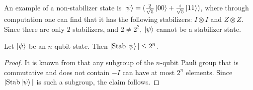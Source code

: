 \documentclass[12pt]{dalthesis}
\begin{document}
An example of a non-stabilizer state is $\ket{\psi} = (\frac{2}{\sqrt{5}}\ket{00} + \frac{i}{\sqrt{5}} \ket{11})$, where through computation one can find that it has the following stabilizers: $I \otimes I$ and $Z \otimes Z$. Since there are only $2$ stabilizers, and $2 \neq 2^2$, $\ket{\psi}$ cannot be a stabilizer state.

\begin{lemma}
\label{StabSize}
Let $\ket{\psi}$ be an $n$-qubit state. Then $|\mathrm{Stab} \ket{\psi}| \leq 2^n$.  
\end{lemma}
\begin{proof}
It is known from \cite{Aaronson_2004} that any subgroup of the $n$-qubit Pauli group that is commutative and does not contain $-I$ can have at most $2^n$ elements. Since $|\mathrm{Stab} \ket{\psi}|$ is such a subgroup, the claim follows.

\end{proof}
\end{document}
